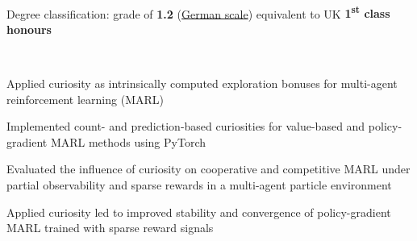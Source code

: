 \documentclass[]{lukas-cv-openfont}
\begin{document}
\noindent
{}
\\
\begin{tightitemize}{1.7em}
    \item Degree classification: grade of \textbf{1.2} (\href{https://en.wikipedia.org/wiki/Academic_grading_in_Germany}{German scale}) equivalent to UK \textbf{1\textsuperscript{st} class honours}
\end{tightitemize}
\largesectionsep



\noindent
{}
\\
\begin{tightitemize}{1.7em}
    \item Applied curiosity as intrinsically computed exploration bonuses for multi-agent reinforcement learning (MARL)
    \item Implemented count- and prediction-based curiosities for value-based and policy-gradient MARL methods using PyTorch
    \item Evaluated the influence of curiosity on cooperative and competitive MARL under partial observability and sparse rewards in a multi-agent particle environment
    \item Applied curiosity led to improved stability and convergence of policy-gradient MARL trained with sparse reward signals
\end{tightitemize}
\largesectionsep
\end{document}
